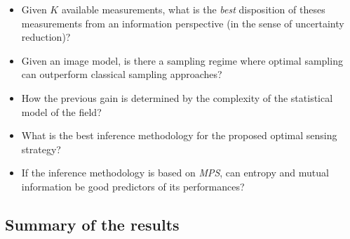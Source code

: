 \begin{itemize}
	\item Given $K$ available measurements, what is the \emph{best} disposition of theses measurements from an information perspective (in the sense of uncertainty reduction)?
	\item Given an image model, is there a sampling regime where optimal sampling can outperform classical sampling approaches?
	\item How the previous gain is determined by the complexity of the statistical model of the field?
	\item What is the best inference methodology for the proposed optimal sensing strategy?
	\item If the inference methodology is based on \emph{MPS}, can entropy and mutual information be good predictors of its performances?
\end{itemize}








































































\subsection{Summary of the results}

